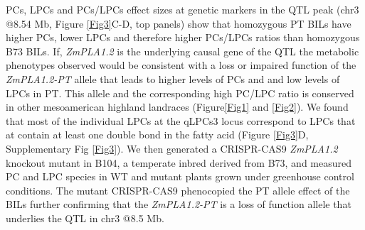 \documentclass[9pt,twocolumn,twoside]{BioRxiv}
\begin{document}
PCs, LPCs and PCs/LPCs effect sizes at genetic markers in the QTL peak (chr3 @8.54 Mb, Figure \ref{Fig3}C-D, top panels) show that homozygous PT BILs have higher PCs, lower LPCs and therefore higher PCs/LPCs ratios than homozygous B73 BILs. 
If, \textit{ZmPLA1.2} is the underlying causal gene of the QTL the metabolic phenotypes observed would be consistent with a loss or impaired function of the \textit{ZmPLA1.2-PT} allele that leads to higher levels of PCs and and low levels of LPCs in PT. 
This allele and the corresponding high PC/LPC ratio is conserved in other mesoamerican highland landraces (Figure\ref{Fig1} and \ref{Fig2}). 
We found that most of the individual LPCs at the qLPCs3 locus correspond to LPCs that at contain at least one double bond in the fatty acid (Figure  \ref{Fig3}D, Supplementary Fig \ref{Fig3}).
We then generated a CRISPR-CAS9 \textit{ZmPLA1.2} knockout mutant in B104, a temperate inbred derived from B73, and measured PC and LPC species in WT and mutant plants grown under greenhouse control conditions. 
The mutant CRISPR-CAS9 phenocopied the PT allele effect of the BILs further confirming that the \textit{ZmPLA1.2-PT} is a loss of function allele that underlies the QTL in chr3 @8.5 Mb. 
\end{document}
